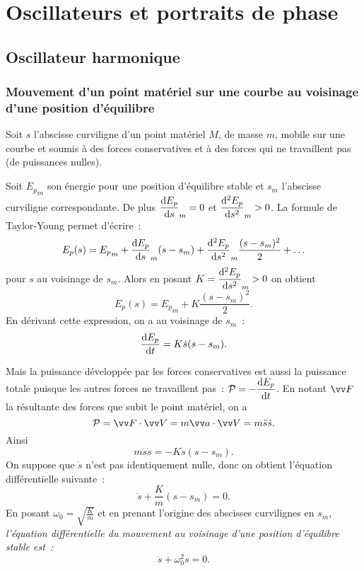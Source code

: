 \chapter{Oscillateurs et portraits de phase}%
\label{chap:oscillateursetportraitdephase}%
\minitoc{}
\minilof{}
\minilot{}

\section{Oscillateur harmonique}%
\label{chap5-sec:oscillateur}%

\subsection{Mouvement d'un point matériel sur une courbe au voisinage d'une
position d'équilibre}%
\label{chap5-subsec:mvtauvoisinagedunepositiondequilibre}%

Soit \(s\) l'abscisse curviligne d'un point matériel \(M\), de masse \(m\),
mobile sur une courbe et soumis à des forces conservatives et à des forces qui
ne travaillent pas (de puissances nulles).

Soit \({E_{p}}_m\) son énergie pour une position d'équilibre stable et \(s_m\)
l'abscisse curviligne correspondante. De plus \(\dfrac{\mathrm{d} E_p}{\mathrm{d} s}_m=0\) et
\(\dfrac{\mathrm{d}^2 E_p}{\mathrm{d} {s}^2}_m>0\). La formule de Taylor-Young permet d'écrire~:
\begin{equation}%
  E_p(s) = {E_p}_m + \derived{E_p}{s}_m (s-s_m) + \deriveds{E_p}{s}_m
  \frac{(s-s_m)^2}{2} + \ldots
\end{equation}%
pour \(s\) au voisinage de \(s_m\). Alors en posant \(K=\dfrac{\mathrm{d}^2 E_p}{\mathrm{d} {s}^2}_m>0\)
on obtient
\begin{equation}%
  E_p(s) = {E_p}_m + K \frac{(s-s_m)^2}{2}.
\end{equation}%
En dérivant cette expression, on a au voisinage de \(s_m\)~:
\begin{equation}%
  \derived{E_p}{t} = K \dot{s} (s-s_m).
\end{equation}%

Mais la puissance développée par les forces conservatives est aussi la
puissance totale puisque les autres forces ne travaillent pas~:
\(\mathcal{P}=-\dfrac{\mathrm{d} E_p}{\mathrm{d} t}\). En notant \(\vF\) la résultante des forces que subit
le point matériel, on a
\begin{equation}%
  \P = \vF \cdot \vV = m \va \cdot \vV = m\ddot{s} \dot{s}.
\end{equation}%
Ainsi
\begin{equation}%
  m\ddot{s}\dot{s} = -K \dot{s}(s-s_m).
\end{equation}%
On suppose que \(\dot{s}\) n'est pas identiquement nulle, donc on obtient
l'équation différentielle suivante~:
\begin{equation}%
  \ddot{s} + \frac{K}{m}(s-s_m) = 0.
\end{equation}%
En posant \(\omega_0 = \sqrt{\frac{K}{m}}\) et en prenant l'origine des
abscisses curvilignes en \(s_m\), \emph{l'équation différentielle du mouvement
au voisinage d'une position d'équilibre stable est~:}
\begin{equation}%
  \ddot{s} + \omega_0^2 s = 0.
\end{equation}%

